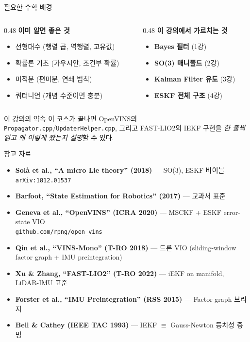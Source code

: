 \begin{frame}{필요한 수학 배경}
  \begin{columns}[T]
    \begin{column}{0.48\textwidth}
      \textbf{이미 알면 좋은 것}
      \begin{itemize}\footnotesize
        \item 선형대수 (행렬 곱, 역행렬, 고유값)
        \item 확률론 기초 (가우시안, 조건부 확률)
        \item 미적분 (편미분, 연쇄 법칙)
        \item 쿼터니언 (개념 수준이면 충분)
      \end{itemize}
    \end{column}
    \begin{column}{0.48\textwidth}
      \textbf{이 강의에서 가르치는 것}
      \begin{itemize}\footnotesize
        \item \textbf{Bayes 필터} (1강)
        \item \textbf{SO(3) 매니폴드} (2강)
        \item \textbf{Kalman Filter 유도} (3강)
        \item \textbf{ESKF 전체 구조} (4강)
      \end{itemize}
    \end{column}
  \end{columns}
  \vspace{0.8em}
  \begin{block}{이 강의의 약속}
    이 코스가 끝나면 OpenVINS의 \texttt{Propagator.cpp}/\texttt{UpdaterHelper.cpp},
    그리고 FAST-LIO2의 IEKF 구현을 \emph{한 줄씩 읽고 왜 이렇게 짰는지 설명}할 수 있다.
  \end{block}
\end{frame}

\begin{frame}{참고 자료}
  \begin{itemize}
    \item \textbf{Solà et al., ``A micro Lie theory'' (2018)} — SO(3), ESKF 바이블\\
          \texttt{arXiv:1812.01537}
    \item \textbf{Barfoot, ``State Estimation for Robotics'' (2017)} — 교과서 표준
    \item \textbf{Geneva et al., ``OpenVINS'' (ICRA 2020)} — MSCKF + ESKF error-state VIO\\
          \texttt{github.com/rpng/open\_vins}
    \item \textbf{Qin et al., ``VINS-Mono'' (T-RO 2018)} — 드론 VIO (sliding-window factor graph + IMU preintegration)
    \item \textbf{Xu \& Zhang, ``FAST-LIO2'' (T-RO 2022)} — iEKF on manifold, LiDAR-IMU 표준
    \item \textbf{Forster et al., ``IMU Preintegration'' (RSS 2015)} — Factor graph 브리지
    \item \textbf{Bell \& Cathey (IEEE TAC 1993)} — IEKF $\equiv$ Gauss-Newton 등치성 증명
  \end{itemize}
\end{frame}


